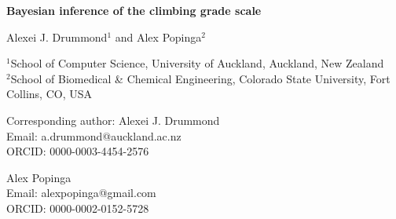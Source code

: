 \documentclass[12pt]{article}
\begin{document}
\thispagestyle{empty}

\begin{center}
{\LARGE \textbf{Bayesian inference of the climbing grade scale}}

\vspace{2cm}

Alexei J. Drummond$^{1}$ and Alex Popinga$^{2}$

\vspace{1cm}

$^{1}$School of Computer Science, University of Auckland, Auckland, New Zealand\\
$^{2}$School of Biomedical \& Chemical Engineering, Colorado State University, Fort Collins, CO, USA

\vspace{1cm}

Corresponding author: Alexei J. Drummond\\
Email: a.drummond@auckland.ac.nz\\
ORCID: 0000-0003-4454-2576

\vspace{0.5cm}

Alex Popinga\\
Email: alexpopinga@gmail.com\\
ORCID: 0000-0002-0152-5728

\end{center}
\end{document}
